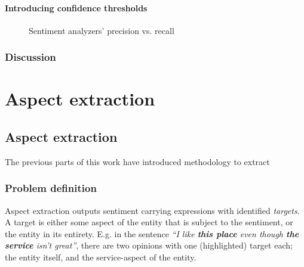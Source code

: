 \documentclass[a4paper,11pt]{kth-mag}
\begin{document}
\subsection{Introducing confidence thresholds}
\begin{figure}[h]
  \centering
  \caption{Sentiment analyzers' precision vs. recall}
  \label{fig:pr_curve}
\end{figure}


\section{Discussion}


\part{Aspect extraction}
\chapter{Aspect extraction}

The previous parts of this work have introduced methodology to extract

\section{Problem definition}
Aspect extraction outputs sentiment carrying expressions with identified \emph{targets}. A target is either some aspect of the entity that is subject to the sentiment, or the entity in its entirety. E.g. in the sentence \emph{``I like \textbf{this place} even though \textbf{the service} isn't great''},  there are two opinions with one (highlighted) target each; the entity itself, and the service-aspect of the entity.
\end{document}
